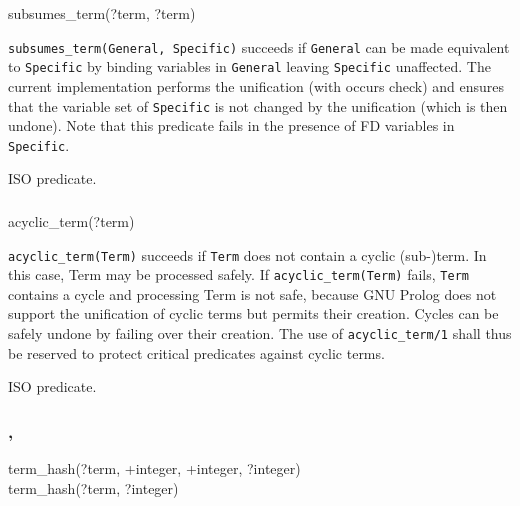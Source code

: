 \begin{TemplatesOneCol}
subsumes\_term(?term, ?term)

\end{TemplatesOneCol}

\Description

\texttt{subsumes\_term(General, Specific)} succeeds if \texttt{General} can
be made equivalent to \texttt{Specific} by binding variables in
\texttt{General} leaving \texttt{Specific} unaffected. The current implementation performs the unification (with
occurs check) and ensures that the variable set of \texttt{Specific} is not
changed by the unification (which is then undone). Note that this predicate
fails in the presence of FD variables in \texttt{Specific}.

\PlErrorsNone

\Portability

ISO predicate.

\subsubsection{}

\begin{TemplatesOneCol}
acyclic\_term(?term)

\end{TemplatesOneCol}

\Description

\texttt{acyclic\_term(Term)} succeeds if \texttt{Term} does not contain a
cyclic (sub-)term. In this case, Term may be processed safely. If
\texttt{acyclic\_term(Term)} fails, \texttt{Term} contains a cycle and
processing Term is not safe, because GNU Prolog does not support the
unification of cyclic terms but permits their creation. Cycles can be safely
undone by failing over their creation. The use of \texttt{acyclic\_term/1}
shall thus be reserved to protect critical predicates against cyclic terms.

\PlErrorsNone

\Portability

ISO predicate.

\subsubsection{,\label{term-hash/4}
            }


\begin{TemplatesOneCol}
term\_hash(?term, +integer, +integer, ?integer) \\
term\_hash(?term, ?integer)

\end{TemplatesOneCol}

